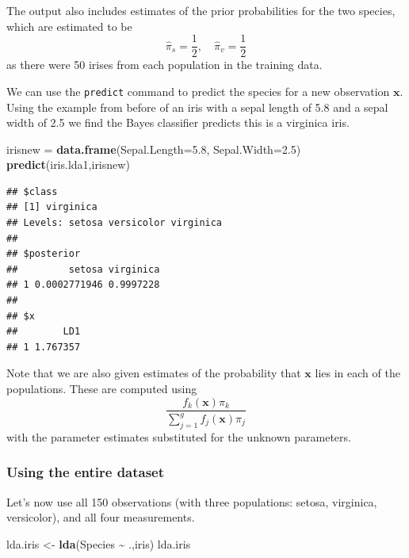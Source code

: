 \documentclass[
]{book}
\newenvironment{Shaded}{\begin{snugshade}}{\end{snugshade}}
\newcommand{\AttributeTok}[1]{\textcolor[rgb]{0.13,0.29,0.53}{#1}}
\newcommand{\FloatTok}[1]{\textcolor[rgb]{0.00,0.00,0.81}{#1}}
\newcommand{\FunctionTok}[1]{\textcolor[rgb]{0.13,0.29,0.53}{\textbf{#1}}}
\newcommand{\NormalTok}[1]{#1}
\newcommand{\OtherTok}[1]{\textcolor[rgb]{0.56,0.35,0.01}{#1}}
\newcommand{\SpecialCharTok}[1]{\textcolor[rgb]{0.81,0.36,0.00}{\textbf{#1}}}
\theoremstyle{definition}
\theoremstyle{definition}
\theoremstyle{definition}
\theoremstyle{definition}
\theoremstyle{remark}
\begin{document}
The output also includes estimates of the prior probabilities for the two species, which are estimated to be
\[\hat{\pi}_s = \frac{1}{2}, \quad \hat{\pi}_v = \frac{1}{2}\]
as there were 50 irises from each population in the training data.

We can use the \texttt{predict} command to predict the species for a new observation \(\mathbf x\). Using the example from before of an iris with a sepal length of 5.8 and a sepal width of 2.5 we find the Bayes classifier predicts this is a virginica iris.

\begin{Shaded}
\begin{Highlighting}[]
\NormalTok{irisnew }\OtherTok{=} \FunctionTok{data.frame}\NormalTok{(}\AttributeTok{Sepal.Length=}\FloatTok{5.8}\NormalTok{, }\AttributeTok{Sepal.Width=}\FloatTok{2.5}\NormalTok{)}
\FunctionTok{predict}\NormalTok{(iris.lda1,irisnew)}
\end{Highlighting}
\end{Shaded}

\begin{verbatim}
## $class
## [1] virginica
## Levels: setosa versicolor virginica
## 
## $posterior
##         setosa virginica
## 1 0.0002771946 0.9997228
## 
## $x
##        LD1
## 1 1.767357
\end{verbatim}

Note that we are also given estimates of the probability that \(\mathbf x\) lies in each of the populations. These are computed using
\[\frac{f_k(\mathbf x)\pi_k}{\sum_{j=1}^g f_j(\mathbf x)\pi_j}\]
with the parameter estimates substituted for the unknown parameters.

\hypertarget{using-the-entire-dataset}{%
\subsubsection*{Using the entire dataset}\label{using-the-entire-dataset}}

Let's now use all 150 observations (with three populations: setosa, virginica, versicolor), and all four measurements.

\begin{Shaded}
\begin{Highlighting}[]
\NormalTok{lda.iris }\OtherTok{\textless{}{-}} \FunctionTok{lda}\NormalTok{(Species }\SpecialCharTok{\textasciitilde{}}\NormalTok{ .,iris)}
\NormalTok{lda.iris }
\end{Highlighting}
\end{Shaded}
\end{document}
